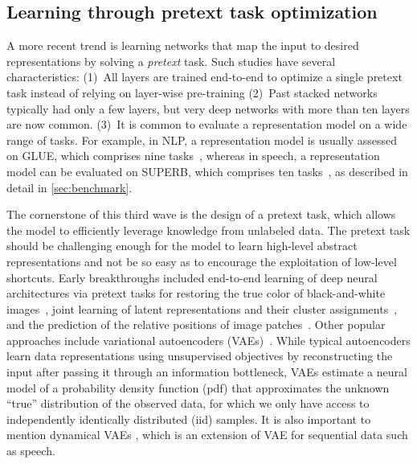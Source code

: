 \subsection{Learning through pretext task optimization}

A more recent trend is learning networks that map the input to desired
representations by solving a \textit{pretext} task. Such studies have several
characteristics:
(1)~All layers are trained end-to-end to optimize a single pretext task instead
of relying on layer-wise pre-training
(2)~Past stacked networks typically had only a few layers, but 
very deep networks with more than ten layers are now common.
(3)~It is common to evaluate a representation model on a wide range of tasks.
For example, in NLP, a representation model is usually assessed on GLUE,
which comprises nine tasks~\parencite{wang_glue_2018}, whereas in speech, a representation model can be
evaluated on SUPERB, which comprises ten tasks~\parencite{yang_superb_2021}, 
as described in detail in \cref{sec:benchmark}.

The cornerstone of this third wave is the design of a pretext task, which
allows the model to efficiently leverage knowledge from unlabeled data.
The pretext task should be challenging enough for the model to learn high-level
abstract representations and 
  not be so easy as to encourage the exploitation of low-level shortcuts.  %
Early breakthroughs included end-to-end learning of deep neural architectures
via pretext tasks for restoring the true color of black-and-white
images~\parencite{zhang_colorful_2016}, joint learning of latent representations and their
cluster assignments~\parencite{caron_deep_2018}, and the prediction of the relative positions of
image patches~\parencite{doersch_unsupervised_2016}. Other popular approaches include variational
autoencoders (VAEs)~\parencite{kingma_autoencoding_2014, rezende_stochastic_2014}. While typical autoencoders learn data
representations using unsupervised objectives by reconstructing the input
after passing it through an information bottleneck, VAEs estimate a neural model of a probability density function (pdf) that approximates the unknown “true” distribution of the observed data, for which we only have access to independently identically distributed (iid) samples. It is also important to mention dynamical VAEs \parencite{girin_dynamical_2021}, which is an extension of VAE for sequential data such as speech.

